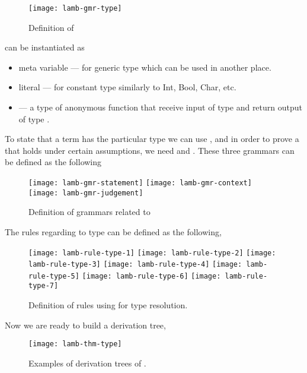 \documentclass[master.tex]{subfiles}
\begin{document}
\begin{figure}[H]
    \centering
\begin{minipage}{0.7\textwidth}
    \texttt{[image: lamb-gmr-type]}
\end{minipage}
\caption{Definition of }
\end{figure}

\vspace{-2em}
 can be instantiated as
\begin{itemize}
\item meta variable --- for generic type which can be used in another place.
\item literal --- for constant type similarly to Int, Bool, Char, etc.
\item {} --- a type of anonymous function that receive input
  of type  and return output of type .
\end{itemize}

To state that a term has the particular type we can use ,
and in order to prove a that  holds under certain
assumptions, we need  and . These three
grammars can be defined as the following

\begin{figure}[H]
    \centering
\begin{minipage}{0.6\textwidth}
    \texttt{[image: lamb-gmr-statement]}
    \texttt{[image: lamb-gmr-context]}
    \texttt{[image: lamb-gmr-judgement]}
\end{minipage}
\caption{Definition of grammars related to }
\end{figure}

The rules regarding to type can be defined as the following,
\vspace{-1em}
\begin{figure}[H]
    \centering
\begin{minipage}{0.5\textwidth}
    \texttt{[image: lamb-rule-type-1]}
    \texttt{[image: lamb-rule-type-2]}
    \texttt{[image: lamb-rule-type-3]}
    \texttt{[image: lamb-rule-type-4]}
    \texttt{[image: lamb-rule-type-5]}
    \texttt{[image: lamb-rule-type-6]}
    \texttt{[image: lamb-rule-type-7]}
\end{minipage}
\caption{Definition of rules using for type resolution.}
\end{figure}

Now we are ready to build a derivation tree,

\begin{figure}[H]
    \centering
\begin{minipage}{\textwidth}
    \texttt{[image: lamb-thm-type]}
\end{minipage}
\caption{Examples of derivation trees of .}
\end{figure}
\end{document}
